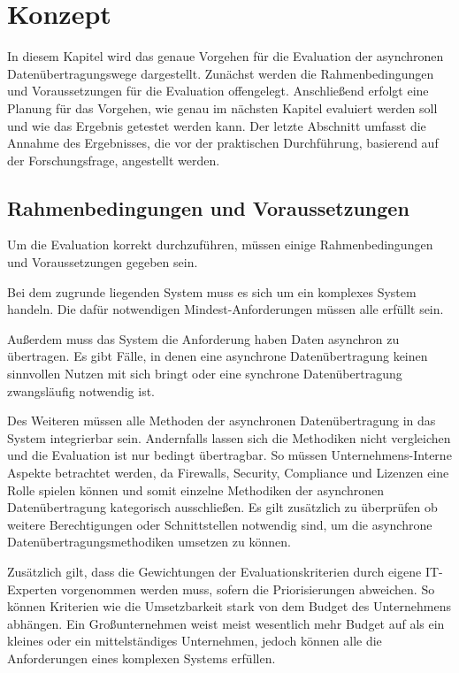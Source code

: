 \chapter{Konzept}
\label{ch:Konzept}
In diesem Kapitel wird das genaue Vorgehen für die Evaluation der asynchronen Datenübertragungswege dargestellt. Zunächst werden die Rahmenbedingungen und Voraussetzungen für die Evaluation offengelegt. Anschließend erfolgt eine Planung für das Vorgehen, wie genau im nächsten Kapitel evaluiert werden soll und wie das Ergebnis getestet werden kann. Der letzte Abschnitt umfasst die Annahme des Ergebnisses, die vor der praktischen Durchführung, basierend auf der Forschungsfrage, angestellt werden.

\section{Rahmenbedingungen und Voraussetzungen}
Um die Evaluation korrekt durchzuführen, müssen einige Rahmenbedingungen und Voraussetzungen gegeben sein. 

Bei dem zugrunde liegenden System muss es sich um ein komplexes System handeln. Die dafür notwendigen Mindest-Anforderungen müssen alle erfüllt sein.  

Außerdem muss das System die Anforderung haben Daten asynchron zu übertragen. Es gibt Fälle, in denen eine asynchrone Datenübertragung keinen sinnvollen Nutzen mit sich bringt oder eine synchrone Datenübertragung zwangsläufig notwendig ist.

Des Weiteren müssen alle Methoden der asynchronen Datenübertragung in das System integrierbar sein. Andernfalls lassen sich die Methodiken nicht vergleichen und die Evaluation ist nur bedingt übertragbar. So müssen Unternehmens-Interne Aspekte betrachtet werden, da Firewalls, Security, Compliance und Lizenzen eine Rolle spielen können und somit einzelne Methodiken der asynchronen Datenübertragung kategorisch ausschließen. Es gilt zusätzlich zu überprüfen ob weitere Berechtigungen oder Schnittstellen notwendig sind, um die asynchrone Datenübertragungsmethodiken umsetzen zu können. 

Zusätzlich gilt, dass die Gewichtungen der Evaluationskriterien durch eigene IT-Experten vorgenommen werden muss, sofern die Priorisierungen abweichen. So können Kriterien wie die Umsetzbarkeit stark von dem Budget des Unternehmens abhängen. Ein Großunternehmen weist meist wesentlich mehr Budget auf als ein kleines oder ein mittelständiges Unternehmen, jedoch können alle die Anforderungen eines komplexen Systems erfüllen. 

